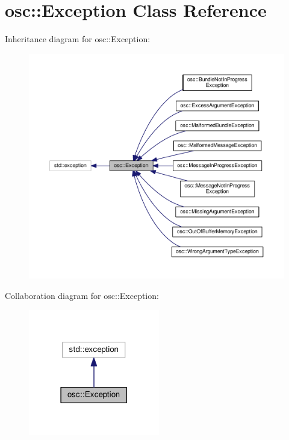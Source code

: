 \hypertarget{classosc_1_1_exception}{}\section{osc\+:\+:Exception Class Reference}
\label{classosc_1_1_exception}


Inheritance diagram for osc\+:\+:Exception\+:\nopagebreak
\begin{figure}[H]
\begin{center}
\leavevmode
\includegraphics[width=350pt]{classosc_1_1_exception__inherit__graph}
\end{center}
\end{figure}


Collaboration diagram for osc\+:\+:Exception\+:\nopagebreak
\begin{figure}[H]
\begin{center}
\leavevmode
\includegraphics[width=162pt]{classosc_1_1_exception__coll__graph}
\end{center}
\end{figure}
